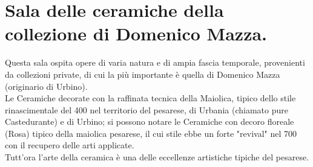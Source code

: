 \documentclass[12pt,a4paper]{article}
\begin{document}
	\section{Sala delle ceramiche della collezione di Domenico Mazza.}
	Questa sala ospita opere di varia natura e di ampia fascia temporale, provenienti da collezioni private, di cui la più importante è quella di Domenico Mazza (originario di Urbino).\\ 
	Le Ceramiche decorate con la raffinata tecnica della Maiolica, tipico dello stile rinascimentale del 400 nel territorio del pesarese, di Urbania (chiamato pure Castedurante) e di Urbino; si possono notare le Ceramiche con decoro floreale (Rosa) tipico della maiolica pesarese, il cui stile ebbe un forte "revival" nel 700 con il recupero delle arti applicate.\\
	Tutt'ora l'arte della ceramica è una delle eccellenze artistiche tipiche del pesarese.\\
	
	
\end{document}
